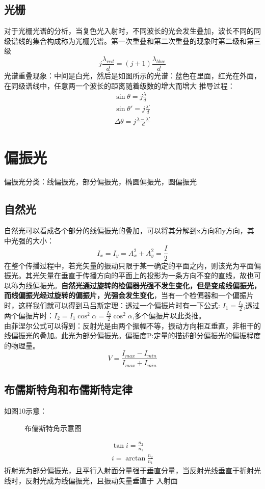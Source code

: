 \documentclass[UFT8]{article}
\begin{document}
\subsection{光栅}
对于光栅光谱的分析，当复色光入射时，不同波长的光会发生叠加，波长不同的同级谱线的集合构成称为光栅光谱。第一次重叠和第二次重叠的现象时第二级和第三级\[
	j\frac{\lambda_{red}}{d}=(j+1)\frac{\lambda_{blue}}{d}
\]
光谱重叠现象：中间是白光，然后是如图所示的光谱：蓝色在里面，红光在外面，在同级谱线中，任意两一个波长的距离随着级数的增大而增大
推导过程：
\begin{gather*}
\sin \theta=j\frac{\lambda}{d}\\
\sin \theta'=j\frac{\lambda'}{d}\\
\Delta\theta=j\frac{\lambda-\lambda'}{d}
\end{gather*}
\section{偏振光}
偏振光分类：线偏振光，部分偏振光，椭圆偏振光，圆偏振光
\subsection{自然光}
自然光可以看成各个部分的线偏振光的叠加，可以将其分解到x方向和y方向，其中光强的大小：
\[
	I_{x}=I_{y}=A_{x}^{2}+A_{y}^{2}=\frac{I}{2}
\]
在整个传播过程中，若光矢量的振动只限于某一确定的平面之内，则该光为平面偏振光。其光矢量在垂直于传播方向的平面上的投影为一条方向不变的直线，故也可以称为线偏振光。\textbf{自然光通过旋转的检偏器光强不发生变化，但是变成线偏振光，而线偏振光经过旋转的偏振片，光强会发生变化}，当有一个检偏器和一个偏振片时，这样我们就可以得到马吕斯定理：透过一个偏振片时有一下公式:
$I_{1}=\frac{I_0}{2}$,透过两个偏振片时：$I_2=I_1\cos^2\alpha=\frac{I_0}{2}\cos^2\alpha$,多个偏振片以此类推。\\
由菲涅尔公式可以得到：反射光是由两个振幅不等，振动方向相互垂直，非相干的线偏振光的叠加。此光为部分偏振光。偏振度P:定量的描述部分偏振光的偏振程度的物理量。
\[		
	V=\frac{I_{max}-I_{min}}{I_{max}+I_{min}}
\]
\subsection{布儒斯特角和布儒斯特定律}
如图10示意：
\begin{figure}[htbp]
\begin{center}
\end{center}
\caption{布儒斯特角示意图}
\end{figure}
\begin{gather*}
\tan i=\frac{n_2}{n_1}\\
i=\arctan\frac{n_2}{n_1}
\end{gather*}
折射光为部分偏振光，且平行入射面分量强于垂直分量，当反射光线垂直于折射光线时，反射光成为线偏振光，且振动矢量垂直于 入射面
\end{document}
